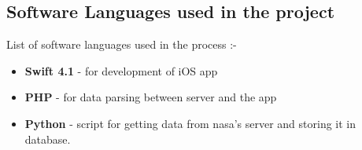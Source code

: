 \subsection{Software Languages used in the project}

List of software languages used in the process :-

\begin{itemize}
    \item \textbf{Swift 4.1} - for development of iOS app \\
    \item \textbf{PHP} - for data parsing between server and the app \\
    \item \textbf{Python} - script for getting data from \gls{nasa}'s server and storing it in database. \\
\end{itemize}

